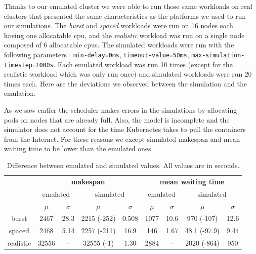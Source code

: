 Thanks to our emulated cluster we were able to run those same workloads on real
clusters that presented the same characteristics as the platforms we used to
run our simulations. The \textit{burst} and \textit{spaced} workloads were run
on 16 nodes each having one allocatable cpu, and the \textit{realistic}
workload was run on a single node composed of 6 allocatable cpus. The simulated
workloads were run with the following parameters : \texttt{min-delay=0ms},
\texttt{timeout-value=50ms}, \texttt{max-simulation-timestep=1000s}. Each
emulated workload was run 10 times (except for the realistic workload which was
only run once) and simulated workloads were run 20 times each. Here are the
deviations we observed between the simulation and the emulation.

As we saw earlier the scheduler makes errors in the simulations by allocating
pods on nodes that are already full. Also, the model is incomplete and the
simulator does not account for the time Kubernetes takes to pull the containers
from the Internet. For these reasons we except simulated makespan and mean
waiting time to be lower than the emulated ones.

\begin{table}
	\centering
	\begin{tabular}{|c|c|c|c|c|c|c|c|c|}
		\hline

		\multirow{3}{*}{} & \multicolumn{4}{c|}{\textbf{makespan}} & \multicolumn{4}{c|}{\textbf{mean waiting time}}\\

		\cline{2-9}

		& \multicolumn{2}{c|}{emulated} &
		\multicolumn{2}{c|}{simulated} & \multicolumn{2}{c|}{emulated}
		& \multicolumn{2}{c|}{simulated} \\

		\cline{2-9}

		& $\mu$ & $\sigma$ & $\mu$ & $\sigma$ & $\mu$ & $\sigma$ & $\mu$ & $\sigma$ \\
		
		\hline

		burst & 2467 & 28.3 & 2215 (-252) & 0.508 & 1077 & 10.6 & 970 (-107) & 12.6 \\
		spaced & 2468 & 5.14 & 2257 (-211) & 16.9 & 146 & 1.67 & 48.1 (-97.9) & 9.44 \\
		realistic & 32556 & - & 32555 (-1) & 1.30 & 2884 & - & 2020 (-864) & 950 \\
		\hline
	\end{tabular}
	\caption{Difference between emulated and simulated values. All values are in seconds.}
	\label{tab:deviation}
\end{table}

